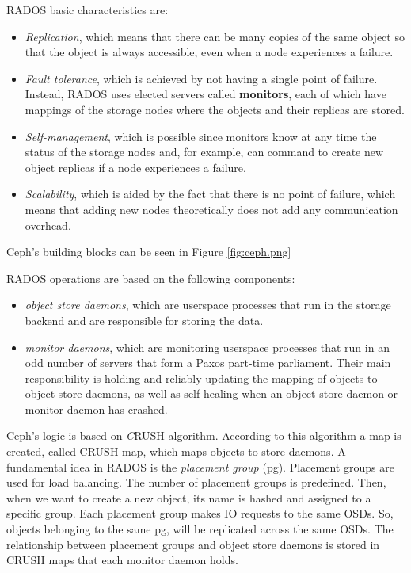 RADOS basic characteristics are:
\begin{itemize}
\item \textit{Replication}, which means that there can be many copies
of the same object so that the object is always accessible,
even when a node experiences a failure.
\item \textit{Fault tolerance}, which is achieved by not having a
single point of failure. Instead, RADOS uses elected servers
called \textbf{monitors}, each of which have mappings of the
storage nodes where the objects and their replicas are stored.
\item \textit{Self-management}, which is possible since monitors know
at any time the status of the storage nodes and, for example,
can command to create new object replicas if a node experiences
a failure.
\item \textit{Scalability}, which is aided by the fact that there is no
point of failure, which means that adding new nodes
theoretically does not add any communication overhead.
\end{itemize}

Ceph's building blocks can be seen in Figure \ref{fig:ceph.png}


RADOS operations are based on the following components:
\begin{itemize}
    \item \textit{object store daemons}, which are userspace processes that run 
        in the storage backend and are responsible for storing the data.
    \item \textit{monitor daemons}, which are monitoring userspace processes 
        that run in an odd number of servers that form a Paxos part-time 
        parliament\cite{Paxos}. Their main responsibility is holding and 
        reliably updating the mapping of objects to object store daemons, as 
        well as self-healing when an object store daemon or monitor daemon has 
        crashed.
\end{itemize}

Ceph's logic is based on \textit CRUSH algorithm. According to this algorithm a
map is created, called CRUSH map, which maps objects to store daemons. A
fundamental idea in RADOS is the \textit{placement group} (pg). Placement groups
are used for load balancing. The number of placement groups is predefined. Then,
when we want to create a new object, its name is hashed and assigned to a
specific group. Each placement group makes IO requests to the same OSDs. So,
objects belonging to the same pg, will be replicated across the same OSDs. The
relationship between placement groups and object store daemons is stored in
CRUSH maps that each monitor daemon holds.   
  
